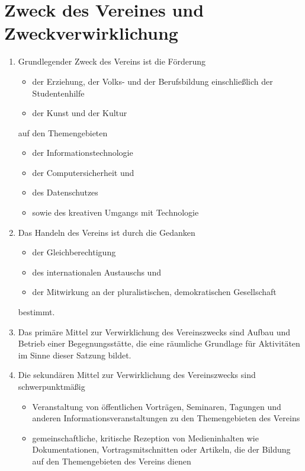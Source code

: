 \documentclass[fontsize=12pt,paper=a4,pagesize,headings=small]{scrartcl}
\begin{document}
\section{Zweck des Vereines und Zweckverwirklichung}
\begin{enumerate}
	\item Grundlegender Zweck des Vereins ist die Förderung
		\begin{itemize}
			\item der Erziehung, der Volks- und der Berufsbildung einschließlich
				  der Studentenhilfe
			\item der Kunst und der Kultur
		\end{itemize}
		auf den Themengebieten
		\begin{itemize}
			\item der Informationstechnologie
			\item der Computersicherheit und
			\item des Datenschutzes
			\item sowie des kreativen Umgangs mit Technologie
		\end{itemize}

	\item Das Handeln des Vereins ist durch die Gedanken
		\begin{itemize}
			\item der Gleichberechtigung
			\item des internationalen Austauschs und
			\item der Mitwirkung an der pluralistischen, demokratischen
				Gesellschaft
		\end{itemize}
		bestimmt.

	\item Das primäre Mittel zur Verwirklichung des Vereinszwecks sind
		Aufbau und Betrieb einer Begegnungsstätte, die eine räumliche
		Grundlage für Aktivitäten im Sinne dieser Satzung bildet.

	\item Die sekundären Mittel zur Verwirklichung des Vereinszwecks sind
		schwerpunktmäßig

	\begin{itemize}
		\item Veranstaltung von öffentlichen Vorträgen, Seminaren, Tagungen und
			anderen Informationsveranstaltungen zu den Themengebieten
			des Vereins

		\item gemeinschaftliche, kritische Rezeption von Medieninhalten
			wie Dokumentationen, Vortragsmitschnitten oder Artikeln, die der
			Bildung auf den Themengebieten des Vereins dienen


\end{itemize}
\end{enumerate}
\end{document}
